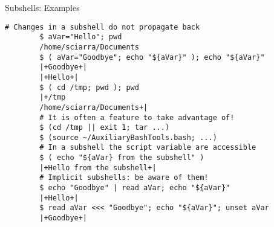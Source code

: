 \begin{frame}[fragile]{Subshells: Examples}
    \begin{lstlisting}[style=MyBash]
        # Changes in a subshell do not propagate back
        $ aVar="Hello"; pwd
        /home/sciarra/Documents
        $ ( aVar="Goodbye"; echo "${aVar}" ); echo "${aVar}"
        |+Goodbye+|
        |+Hello+|
        $ ( cd /tmp; pwd ); pwd
        |+/tmp
        /home/sciarra/Documents+|
        # It is often a feature to take advantage of!
        $ (cd /tmp || exit 1; tar ...)
        $ (source ~/AuxiliaryBashTools.bash; ...)
        # In a subshell the script variable are accessible
        $ ( echo "${aVar} from the subshell" )
        |+Hello from the subshell+|
        # Implicit subshells: be aware of them!
        $ echo "Goodbye" | read aVar; echo "${aVar}"
        |+Hello+|
        $ read aVar <<< "Goodbye"; echo "${aVar}"; unset aVar
        |+Goodbye+|
    \end{lstlisting}
\end{frame}
